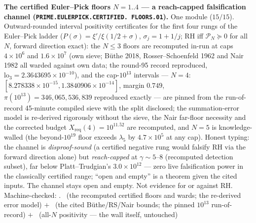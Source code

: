 \documentclass[11pt,a4paper]{article}
\theoremstyle{definition}
\begin{document}
\par\smallskip\noindent\textbf{The certified Euler--Pick floors
$N = 1..4$ --- a reach-capped falsification channel
(\texttt{PRIME.EULERPICK.\allowbreak CERTIFIED.\allowbreak
FLOORS.01}).}
One module ($15/15$).  Outward-rounded interval positivity
certificates for the first four rungs of the Euler--Pick ladder
($P(\sigma) = \xi'/\xi(1/2+\sigma)$, $\sigma_j = 1 + 1/j$; RH iff
$\mathcal P_N \succeq 0$ for all $N$, forward direction exact):
the $N \le 3$ floors are recomputed in-run at caps $4\times10^6$
and $1.6\times10^7$ (own sieve; B\"uthe 2018, Rosser--Schoenfeld
1962 and Nair 1982 all warded against own data; the round-95
record reproduced, $\mathrm{lo}_3 = 2.3643695\times10^{-10}$),
and the cap-$10^{13}$ intervals --- $N = 4$:
$[8.278338\times10^{-15}, 1.3840906\times10^{-14}]$, margin
$0.749$, $\pi(10^{13}) = 346{,}065{,}536{,}839$ reproduced
exactly --- are pinned from the run-of-record 45-minute compiled
sieve with the split disclosed; the summation-error model is
re-derived rigorously without the sieve, the Nair far-floor
necessity and the corrected budget
$X_{\mathrm{req}}(4) = 10^{11.52}$ are recomputed, and $N = 5$
is knowledge-walled (the beyond-$10^{19}$ floor exceeds
$\lambda_5$ by $4.7\times10^{5}$ at any cap).  Honest typing:
the channel is \emph{disproof-sound} (a certified negative rung
would falsify RH via the forward direction alone) but
\emph{reach-capped} at $\gamma \sim 5$--$8$ (recomputed
detection subset), far below Platt--Trudgian's
$3.0\times10^{12}$ --- zero live falsification power in the
classically certified range; ``open and empty'' is a theorem
given the cited inputs.  The channel stays open and empty.  Not
evidence for or against RH.
Machine-checked: .
\mE\ (the recomputed certified floors and wards; the re-derived
error model) $+$ \mC\ (the cited B\"uthe/RS/Nair bounds; the
pinned $10^{13}$ run-of-record) $+$ \mO\ (all-$N$ positivity ---
the wall itself, untouched)
\par\smallskip
\end{document}
